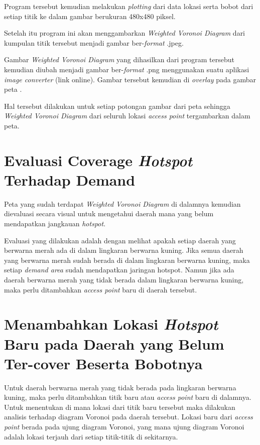 Program tersebut kemudian melakukan \textit{plotting} dari data lokasi serta bobot dari setiap titik ke dalam gambar berukuran 480x480 piksel.

Setelah itu program ini akan menggambarkan \textit{Weighted Voronoi Diagram} dari kumpulan titik tersebut menjadi gambar ber-\textit{format} .jpeg.

Gambar \textit{Weighted Voronoi Diagram} yang dihasilkan dari program tersebut kemudian diubah menjadi gambar ber-\textit{format} .png menggunakan suatu aplikasi \textit{image converter} (link online). Gambar tersebut kemudian di \textit{overlay} pada gambar peta {\ui}.

Hal tersebut dilakukan untuk setiap potongan gambar dari peta {\ui} sehingga \textit{Weighted Voronoi Diagram} dari seluruh lokasi \textit{access point} tergambarkan dalam peta.

\section{Evaluasi Coverage \textit{Hotspot} Terhadap Demand}
Peta {\ui} yang sudah terdapat \textit{Weighted Voronoi Diagram} di dalamnya kemudian dievaluasi secara visual untuk mengetahui daerah mana yang belum mendapatkan jangkauan \textit{hotspot}.

Evaluasi yang dilakukan adalah dengan melihat apakah setiap daerah yang berwarna merah ada di dalam lingkaran berwarna kuning. Jika semua daerah yang berwarna merah sudah berada di dalam lingkaran berwarna kuning, maka setiap \textit{demand area} sudah mendapatkan jaringan hotspot. Namun jika ada daerah berwarna merah yang tidak berada dalam lingkaran berwarna kuning, maka perlu ditambahkan \textit{access point} baru di daerah tersebut.

\section{Menambahkan Lokasi \textit{Hotspot} Baru pada Daerah yang Belum Ter-cover Beserta Bobotnya}

Untuk daerah berwarna merah yang tidak berada pada lingkaran berwarna kuning, maka perlu ditambahkan titik baru atau \textit{access point} baru di dalamnya. Untuk menentukan di mana lokasi dari titik baru tersebut maka dilakukan analisis terhadap diagram Voronoi pada daerah tersebut. Lokasi baru dari \textit{access point} berada pada ujung diagram Voronoi, yang mana ujung diagram Voronoi adalah lokasi terjauh dari setiap titik-titik di sekitarnya. 

